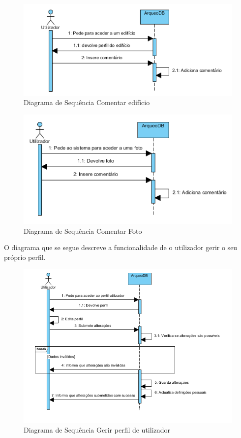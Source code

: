 ﻿\documentclass[12pt,a4paper]{article}
\begin{document}
\begin{figure}[h!]
\centering
\includegraphics[scale=1]{sequencia/comentaredificio}
\caption{Diagrama de Sequência Comentar edifício} 
\end{figure}

\begin{figure}[h!]
\centering
\includegraphics[scale=1]{sequencia/comentarfoto}
\caption{Diagrama de Sequência Comentar Foto} 
\end{figure}

\clearpage
O diagrama que se segue descreve a funcionalidade de o utilizador gerir o seu próprio perfil.\\

\begin{figure}[h!]
\centering
\includegraphics[scale=1]{sequencia/gerirperfil}
\caption{Diagrama de Sequência Gerir perfil de utilizador} 
\end{figure}
\end{document}
